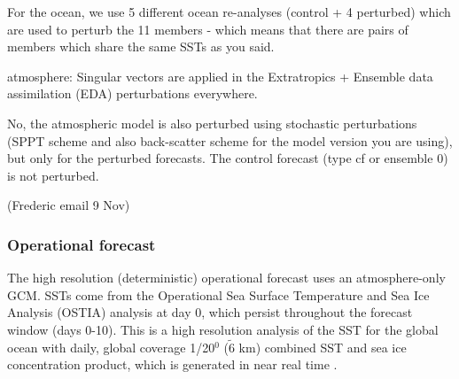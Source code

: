 For the ocean, we use 5 different ocean re-analyses (control + 4 perturbed) which are used to perturb the 11 members - which means that there are pairs of members which share the same SSTs as you said.

atmosphere: Singular vectors are applied in the Extratropics + Ensemble data assimilation (EDA) perturbations everywhere.

No, the atmospheric model is also perturbed using stochastic perturbations (SPPT scheme and also back-scatter scheme for the model version you are using), but only for the perturbed forecasts. The control forecast (type  cf or ensemble 0) is not perturbed. 

(Frederic email 9 Nov)

%


\subsubsection {Operational forecast}  \label{ECMWF_forecast}
The high resolution (deterministic) operational forecast uses an atmosphere-only GCM. SSTs come from the Operational Sea Surface Temperature and Sea Ice Analysis (OSTIA) analysis at day 0, which persist throughout the forecast window (days 0-10). This is a high resolution analysis of the SST for the global ocean with daily, global coverage 1/20$^0$ ($\tilde{6}$ km) combined SST and sea ice concentration product, which is generated in near real time \citep{donlon2012operational}.

